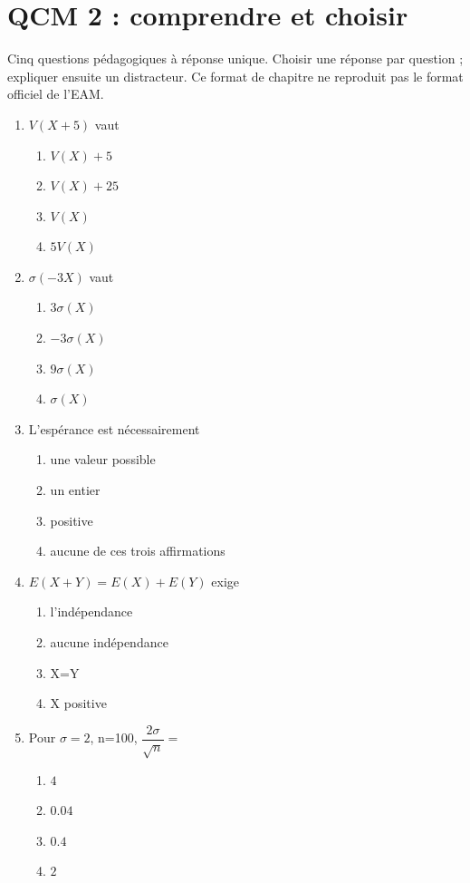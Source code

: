 \endgroup
\begingroup\small
{}\section*{QCM 2 : comprendre et choisir}\label{C08-Q2}
Cinq questions pédagogiques à réponse unique. Choisir une réponse par question ; expliquer ensuite un distracteur. Ce format de chapitre ne reproduit pas le format officiel de l’EAM.
\begin{enumerate}
\item $V(X+5)$ vaut
\begin{enumerate}[label=\Alph*.,itemsep=2pt]
\item $V(X)+5$
\item $V(X)+25$
\item $V(X)$
\item $5V(X)$
\end{enumerate}
\item $\sigma(-3X)$ vaut
\begin{enumerate}[label=\Alph*.,itemsep=2pt]
\item $3\sigma(X)$
\item $-3\sigma(X)$
\item $9\sigma(X)$
\item $\sigma(X)$
\end{enumerate}
\item L’espérance est nécessairement
\begin{enumerate}[label=\Alph*.,itemsep=2pt]
\item une valeur possible
\item un entier
\item positive
\item aucune de ces trois affirmations
\end{enumerate}
\item $E(X+Y)=E(X)+E(Y)$ exige
\begin{enumerate}[label=\Alph*.,itemsep=2pt]
\item l’indépendance
\item aucune indépendance
\item X=Y
\item X positive
\end{enumerate}
\item Pour $\sigma=2$, n=100, $\dfrac{2\sigma}{\sqrt n}=$
\begin{enumerate}[label=\Alph*.,itemsep=2pt]
\item $4$
\item $\num{0,04}$
\item $\num{0,4}$
\item $2$
\end{enumerate}
\end{enumerate}
